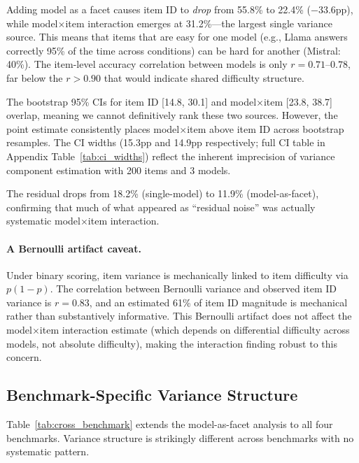 \documentclass[11pt,twocolumn]{article}
\newcommand{\pct}{\%}
\begin{document}
Adding model as a facet causes item ID to \emph{drop} from 55.8\pct{} to 22.4\pct{} ($-$33.6pp), while model$\times$item interaction emerges at 31.2\pct{}---the largest single variance source. This means that items that are easy for one model (e.g., Llama answers correctly 95\pct{} of the time across conditions) can be hard for another (Mistral: 40\pct{}). The item-level accuracy correlation between models is only $r=0.71$--$0.78$, far below the $r>0.90$ that would indicate shared difficulty structure.

The bootstrap 95\pct{} CIs for item ID [14.8, 30.1] and model$\times$item [23.8, 38.7] overlap, meaning we cannot definitively rank these two sources. However, the point estimate consistently places model$\times$item above item ID across bootstrap resamples. The CI widths (15.3pp and 14.9pp respectively; full CI table in Appendix Table~\ref{tab:ci_widths}) reflect the inherent imprecision of variance component estimation with 200 items and 3 models.

The residual drops from 18.2\pct{} (single-model) to 11.9\pct{} (model-as-facet), confirming that much of what appeared as ``residual noise'' was actually systematic model$\times$item interaction.

\paragraph{A Bernoulli artifact caveat.}
Under binary scoring, item variance is mechanically linked to item difficulty via $p(1-p)$. The correlation between Bernoulli variance and observed item ID variance is $r=0.83$, and an estimated 61\pct{} of item ID magnitude is mechanical rather than substantively informative. This Bernoulli artifact does not affect the model$\times$item interaction estimate (which depends on differential difficulty across models, not absolute difficulty), making the interaction finding robust to this concern.

\subsection{Benchmark-Specific Variance Structure}
\label{sec:benchmarks}

Table~\ref{tab:cross_benchmark} extends the model-as-facet analysis to all four benchmarks. Variance structure is strikingly different across benchmarks with no systematic pattern.
\end{document}
